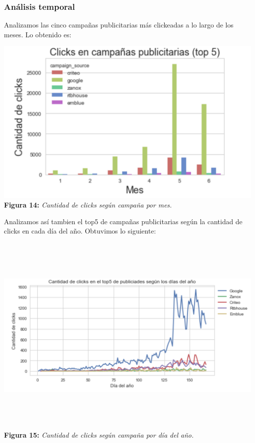 \documentclass[titlepage,a4paper]{article}
\begin{document}
	\subsubsection{Análisis temporal}
	Analizamos las cinco campañas publicitarias más clickeadas a lo largo de los meses. Lo obtenido es: 
	\begin{center}
	\includegraphics[width=15cm] {top5campaniasPublicitariasMasImportantesSegunMes.jpg}\\
	\textbf{Figura 14:}  \textit{Cantidad de clicks según campaña por mes.}
	\end{center}
	Analizamos así tambien el top5 de campañas publicitarias según la cantidad de clicks  en cada día del año. Obtuvimos lo siguiente:
	\begin{center}
	\includegraphics[width=15cm, height = 10cm] {cantidadDeClicksSegunDiaDelAnio.jpg}\\
	\textbf{Figura 15:}  \textit{Cantidad de clicks según campaña por día del año.  }
	\end{center}
\end{document}
